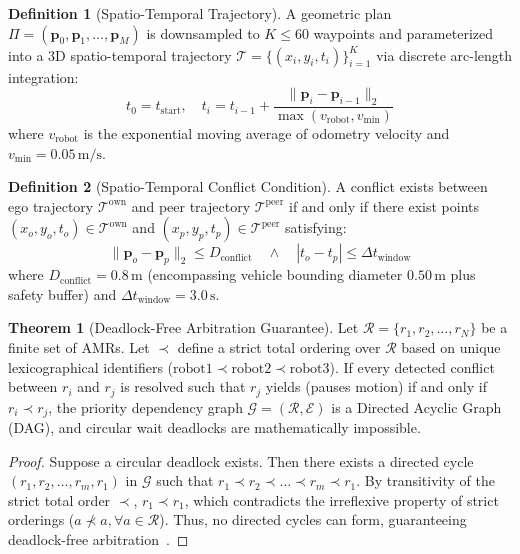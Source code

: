 \documentclass[10pt,twocolumn,a4paper]{article}
\theoremstyle{definition}
\newtheorem{definition}{Definition}
\newtheorem{theorem}{Theorem}
\begin{document}
\begin{definition}[Spatio-Temporal Trajectory]
A geometric plan $\Pi = (\mathbf{p}_0, \mathbf{p}_1, \dots, \mathbf{p}_M)$ is downsampled to $K \le 60$ waypoints and parameterized into a 3D spatio-temporal trajectory $\mathcal{T} = \{ (x_i, y_i, t_i) \}_{i=1}^K$ via discrete arc-length integration:
\begin{equation}
    t_0 = t_{\text{start}}, \quad t_i = t_{i-1} + \frac{\|\mathbf{p}_i - \mathbf{p}_{i-1}\|_2}{\max(v_{\text{robot}}, v_{\min})}
\end{equation}
where $v_{\text{robot}}$ is the exponential moving average of odometry velocity and $v_{\min} = 0.05\,\text{m/s}$.
\end{definition}

\begin{definition}[Spatio-Temporal Conflict Condition]
A conflict exists between ego trajectory $\mathcal{T}^{\text{own}}$ and peer trajectory $\mathcal{T}^{\text{peer}}$ if and only if there exist points $(x_o, y_o, t_o) \in \mathcal{T}^{\text{own}}$ and $(x_p, y_p, t_p) \in \mathcal{T}^{\text{peer}}$ satisfying:
\begin{equation}
    \|\mathbf{p}_o - \mathbf{p}_p\|_2 \le D_{\text{conflict}} \quad \land \quad |t_o - t_p| \le \Delta t_{\text{window}}
\end{equation}
where $D_{\text{conflict}} = 0.8\,\text{m}$ (encompassing vehicle bounding diameter $0.50\,\text{m}$ plus safety buffer) and $\Delta t_{\text{window}} = 3.0\,\text{s}$.
\end{definition}

\begin{theorem}[Deadlock-Free Arbitration Guarantee]
Let $\mathcal{R} = \{r_1, r_2, \dots, r_N\}$ be a finite set of AMRs. Let $\prec$ define a strict total ordering over $\mathcal{R}$ based on unique lexicographical identifiers ($\text{robot1} \prec \text{robot2} \prec \text{robot3}$). If every detected conflict between $r_i$ and $r_j$ is resolved such that $r_j$ yields (pauses motion) if and only if $r_i \prec r_j$, the priority dependency graph $\mathcal{G} = (\mathcal{R}, \mathcal{E})$ is a Directed Acyclic Graph (DAG), and circular wait deadlocks are mathematically impossible.
\end{theorem}
\begin{proof}
Suppose a circular deadlock exists. Then there exists a directed cycle $(r_1, r_2, \dots, r_m, r_1)$ in $\mathcal{G}$ such that $r_1 \prec r_2 \prec \dots \prec r_m \prec r_1$. By transitivity of the strict total order $\prec$, $r_1 \prec r_1$, which contradicts the irreflexive property of strict orderings ($a \not\prec a, \forall a \in \mathcal{R}$). Thus, no directed cycles can form, guaranteeing deadlock-free arbitration~\cite{erdmann1987multiple, cap2015complete}.
\end{proof}
\end{document}
